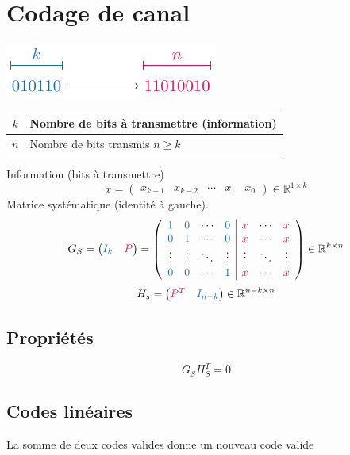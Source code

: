 \documentclass[resume.tex]{subfiles}
\begin{document}
\section{Codage de canal}
\begin{center}
\includegraphics[scale=1,page=1]{drwg_1.pdf}
\end{center}
\begin{center}
\begin{tabular}{c|l}
$k$ & Nombre de bits à transmettre (information)\\\hline
$n$ & Nombre de bits transmis $n\geq k$
\end{tabular}
\end{center}
Information (bits à transmettre)
$$x=\begin{pmatrix}
x_{k-1} &
x_{k-2} &
\cdots &
x_1 &
x_0
\end{pmatrix}\in \mathbb{R}^{1\times k}$$
Matrice systématique (identité à gauche).
$$G_S=\begin{pmatrix}
\textcolor{RoyalBlue}{I_k} & \textcolor{OrangeRed}{P}
\end{pmatrix}=
\left(\begin{array}{cccc|cccc}
\textcolor{RoyalBlue}{1} & \textcolor{RoyalBlue}{0} & \cdots & \textcolor{RoyalBlue}{0} & \textcolor{OrangeRed}{x} & \cdots & \textcolor{OrangeRed}{x}\\
\textcolor{RoyalBlue}{0} & \textcolor{RoyalBlue}{1} & \cdots & \textcolor{RoyalBlue}{0} & \textcolor{OrangeRed}{x} & \cdots & \textcolor{OrangeRed}{x}\\
\vdots & \vdots & \ddots & \vdots & \vdots & \ddots & \vdots\\
\textcolor{RoyalBlue}{0} & \textcolor{RoyalBlue}{0} & \cdots & \textcolor{RoyalBlue}{1} & \textcolor{OrangeRed}{x} & \cdots & \textcolor{OrangeRed}{x}
\end{array}\right)\in\mathbb{R}^{k\times n}$$
$$H_s=\begin{pmatrix}
\textcolor{OrangeRed}{P^{T}} & \textcolor{RoyalBlue}{I_{n-k}}
\end{pmatrix}\in\mathbb{R}^{n-k\times n}$$
\subsection{Propriétés}
$$G_SH_S^T=0$$
\subsection{Codes linéaires}
La somme de deux codes valides donne un nouveau code valide
\end{document}
